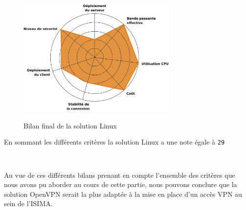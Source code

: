 \begin{figure}[H]
	\begin{center}
		\includegraphics[width=0.7\textwidth]{partie_3/images/linux.png}\\
	\end{center}
	\caption{Bilan final de la solution Linux}
	\label{Graphe linux}
\end{figure}

En sommant les différents critères la solution Linux a une note égale à \verb|29|

~

Au vue de ces différents bilans prenant en compte l'ensemble des critères que nous avons pu aborder au cours de cette partie, nous pouvons conclure que la solution OpenVPN serait la plus adaptée à la mise en place d'un accès VPN au sein de l'ISIMA.
